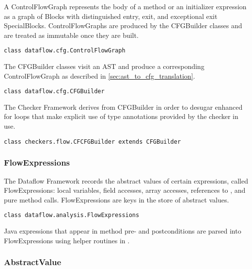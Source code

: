      A ControlFlowGraph represents the body of a method or an initializer expression as a graph of Blocks with distinguished entry, exit, and exceptional exit SpecialBlocks.  ControlFlowGraphs are produced by the CFGBuilder classes and are treated as immutable once they are built.

        \begin{verbatim}class dataflow.cfg.ControlFlowGraph\end{verbatim}

\label{sec:cfg_builder_classes}
    
    The CFGBuilder classes visit an AST and produce a corresponding ControlFlowGraph as described in \autoref{sec:ast_to_cfg_translation}.
    
        \begin{verbatim}class dataflow.cfg.CFGBuilder\end{verbatim}
        
    The Checker Framework derives from CFGBuilder in order to desugar enhanced for loops that make explicit use of type annotations provided by the checker in use.
        
        \begin{verbatim}class checkers.flow.CFCFGBuilder extends CFGBuilder\end{verbatim}


\subsubsection{FlowExpressions}
\label{sec:flow_expressions_class}

    The Dataflow Framework records the abstract values of certain
    expressions, called FlowExpressions:  local variables, field accesses,
    array accesses, references to , and pure method calls.
    FlowExpressions are keys in the store of abstract values.

    \begin{verbatim}class dataflow.analysis.FlowExpressions\end{verbatim}
    
    Java expressions that appear in method pre- and postconditions are parsed into FlowExpressions using helper routines in .

    
\subsubsection{AbstractValue}
\label{sec:abstract_value_classes}

